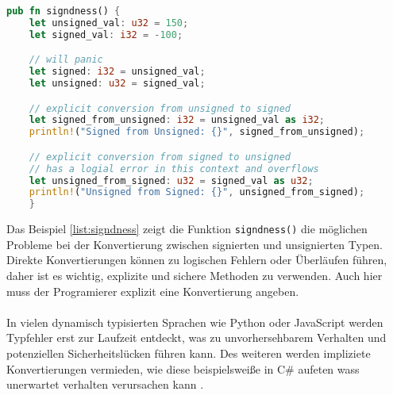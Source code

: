 \begin{lstlisting}[language=Rust, caption={Signiertheit}, label=list:signdness]
pub fn signdness() {
    let unsigned_val: u32 = 150;
    let signed_val: i32 = -100;

    // will panic 
    let signed: i32 = unsigned_val;
    let unsigned: u32 = signed_val;

    // explicit conversion from unsigned to signed
    let signed_from_unsigned: i32 = unsigned_val as i32;
    println!("Signed from Unsigned: {}", signed_from_unsigned);

    // explicit conversion from signed to unsigned
    // has a logial error in this context and overflows
    let unsigned_from_signed: u32 = signed_val as u32;
    println!("Unsigned from Signed: {}", unsigned_from_signed); 
    }
\end{lstlisting}
\noindent
Das Beispiel \ref{list:signdness} zeigt die Funktion \texttt{signdness()} die möglichen Probleme bei der Konvertierung zwischen signierten und unsignierten Typen. 
Direkte Konvertierungen können zu logischen Fehlern oder Überläufen führen, daher ist es wichtig, explizite und sichere Methoden zu verwenden.
Auch hier muss der Programierer explizit eine Konvertierung angeben.\\
\\
In vielen dynamisch typisierten Sprachen wie Python oder JavaScript werden Typfehler erst zur Laufzeit entdeckt, was zu unvorhersehbarem Verhalten und potenziellen Sicherheitslücken führen kann.
Des weiteren werden impliziete Konvertierungen vermieden, wie diese beispielsweiße in C\# aufeten wass unerwartet verhalten verursachen kann \cite[Kapitel 1. Types]{drysdale2024}.

